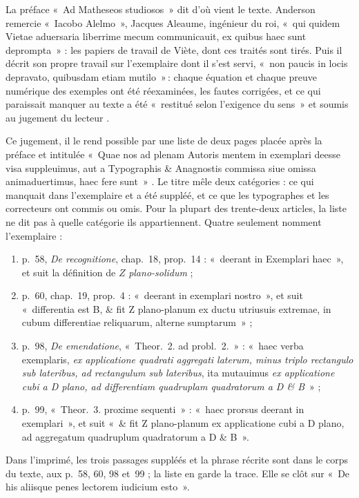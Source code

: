 \documentclass[11pt,a4paper]{article}
\theoremstyle{remark}
\begin{document}
La préface «~Ad Matheseos studiosos~» dit d'où vient le texte. Anderson
remercie «~Iacobo Alelmo~», Jacques Aleaume, ingénieur du roi, «~qui quidem
Vietae aduersaria liberrime mecum communicauit, ex quibus haec sunt
deprompta~» : les papiers de travail de Viète, dont ces traités sont tirés.
Puis il décrit son propre travail sur l'exemplaire dont il s'est servi,
«~non paucis in locis depravato, quibusdam etiam mutilo~»\,: chaque équation
et chaque preuve numérique des exemples ont été réexaminées, les fautes
corrigées, et ce qui paraissait manquer au texte a été «~restitué selon
l'exigence du sens~» et soumis au jugement du lecteur
\cite[préface, 2\textsuperscript{e} page]{anderson1615}.

Ce jugement, il le rend possible par une liste de deux pages placée après la
préface et intitulée «~Quae nos ad plenam Autoris mentem in exemplari deesse
visa suppleuimus, aut a Typographis \& Anagnostis commissa siue omissa
animaduertimus, haec fere sunt~» \cite[liste, après la préface]{anderson1615}.
Le titre mêle deux catégories : ce qui manquait dans l'exemplaire et a été
suppléé, et ce que les typographes et les correcteurs ont commis ou omis.
Pour la plupart des trente-deux articles, la liste ne dit pas à quelle
catégorie ils appartiennent. Quatre seulement nomment l'exemplaire :

\begin{enumerate}
\item p.~58, \emph{De recognitione}, chap.~18, prop.~14 : «~deerant in
Exemplari haec~», et suit la définition de $Z$ \emph{plano-solidum} ;
\item p.~60, chap.~19, prop.~4 : «~deerant in exemplari nostro~», et suit
«~differentia est B, \& fit Z plano-planum ex ductu utriusuis extremae, in
cubum differentiae reliquarum, alterne sumptarum~» ;
\item p.~98, \emph{De emendatione}, «~Theor.~2. ad probl.~2.~» : «~haec
verba exemplaris, \emph{ex applicatione quadrati aggregati laterum, minus
triplo rectangulo sub lateribus, ad rectangulum sub lateribus}, ita
mutauimus \emph{ex applicatione cubi a D plano, ad differentiam quadruplam
quadratorum a D \& B}~» ;
\item p.~99, «~Theor.~3. proxime sequenti~» : «~haec prorsus deerant in
exemplari~», et suit «~\& fit Z plano-planum ex applicatione cubi a D plano,
ad aggregatum quadruplum quadratorum a D \& B~».
\end{enumerate}

\noindent Dans l'imprimé, les trois passages suppléés et la phrase récrite
sont dans le corps du texte, aux p.~58, 60, 98 et~99 ; la liste en garde la
trace. Elle se clôt sur «~De his aliisque penes lectorem iudicium esto~».
\end{document}
